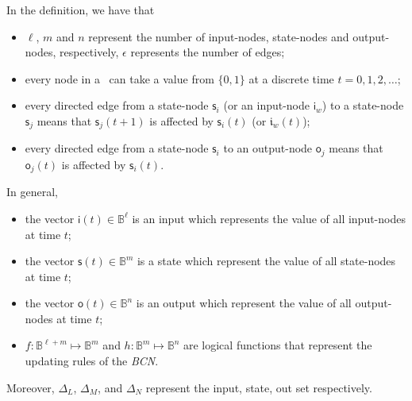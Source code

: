 In the definition, we have that %
\begin{itemize}
	\item $\ell$, $m$ and $n$ represent the number of input-nodes, state-nodes and output-nodes, respectively, $\epsilon$ represents the number of edges;
          \item every node in a \BCN\ can take a value from $\{0,1\}$ at a discrete time $t=0, 1, 2,\ldots$;
	\item every directed edge from a state-node $\mathsf{s}_i$ (or an input-node $\mathsf{i}_w$) to a state-node $\mathsf{s}_j$ means that  $\mathsf{s}_j(t+1)$ is affected by $\mathsf{s}_i(t)$ (or $\mathfrak{i}_w(t)$);	
	\item every directed edge from a state-node $\mathsf{s}_i$ to an output-node $\mathsf{o}_j$ means that   $\mathsf{o}_j(t)$  is affected by $\mathsf{s}_i(t)$.  
	\end{itemize}
In general, 
	\begin{itemize}
	\item the vector $\mathsf{i}(t)\in \mathbb{B}^{\ell}$ is an input which represents the value of all input-nodes at time $t$; 	
	\item the vector $\mathsf{s}(t)\in \mathbb{B}^m$ is a state which represent the value of all state-nodes at time $t$; 	
	\item the vector $\mathsf{o}(t)\in \mathbb{B}^n$ is an output which represent the value of all output-nodes at time $t$;  
	\item $f:\mathbb{B}^{\ell +m}\mapsto \mathbb{B}^m$ and $h:\mathbb{B}^m\mapsto \mathbb{B}^n$ are logical functions that represent the updating rules of the {\em BCN}.
\end{itemize}

Moreover, $\Delta_L $, $\Delta_M$, and $\Delta_N$ represent the input, state, out set respectively. 

